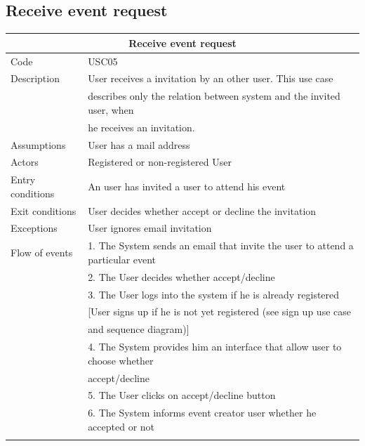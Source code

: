 \documentclass[12pt]{book}
\begin{document}
\vspace*{\fill}
\subsection{Receive event request}
\vspace*{\fill}
\begin{center}
\begin{tabular}{ |l|l| }
  		\hline
  		\hline
  		\multicolumn{2}{|c|}{\large{\textbf{Receive event request}}} \\
  		\hline
  		\hline
  		Code  & USC05\\ 
		\hline
		Description & User receives a invitation by an other user. This use case\\& describes only the relation between system and the invited user, when \\ & he receives an invitation. \\
		\hline
		Assumptions & User has a mail address\\
		\hline
		Actors & Registered or non-registered User\\
		\hline
		Entry conditions & An user has invited a user to attend his event\\
		\hline
		Exit conditions & User decides whether accept or decline the invitation\\ 
		\hline
		Exceptions & User ignores email invitation \\
		\hline
		Flow of events & 
			1. The System sends an email that invite the user to attend a particular event\\&
			2. The User decides whether accept/decline\\&
			3. The User logs into the system if he is already registered\\&
			[User signs up if he is not yet registered (see sign up use case \\&and sequence diagram)]\\&
			4. The System provides him an interface that allow user to choose whether \\ & accept/decline\\&
			5. The User clicks on accept/decline button\\&
			6. The System informs event creator user whether he accepted or not\\ 
  		\hline 
		&\\

\end{tabular}
\end{center}
\end{document}
